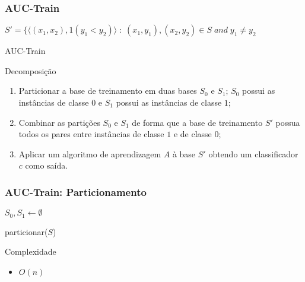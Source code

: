 \begin{frame}
    \frametitle{AUC-Train}

    \begin{algorithm}[H]
        $S' = \{\langle (x_1, x_2), 1(y_1 < y_2) \rangle \; : \; (x_1, y_1), (x_2, y_2) \in S \; and \; y_1 \neq y_2$\;

        \caption{AUC-Train}
    \end{algorithm}

    \begin{block}{Decomposição}
        \begin{enumerate}
            \item Particionar a base de treinamento em duas bases $S_0$ e $S_1$; $S_0$ possui as instâncias de classe $0$ e $S_1$ possui as instâncias de classe $1$;
            \item Combinar as partições $S_0$ e $S_1$ de forma que a base de treinamento $S'$ possua todos os pares entre instâncias de classe $1$ e de classe $0$;
            \item Aplicar um algoritmo de aprendizagem $A$ à base $S'$ obtendo um classificador $c$ como saída.
        \end{enumerate}
    \end{block}
\end{frame}

\begin{frame}
    \frametitle{AUC-Train: Particionamento}

    \begin{function}[H]
        $S_0, S_1 \gets \emptyset$\;



        \caption{particionar($S$)}
    \end{function}

    \begin{block}{Complexidade}
        \begin{itemize}
            \item $O(n)$
        \end{itemize}
    \end{block}
\end{frame}

